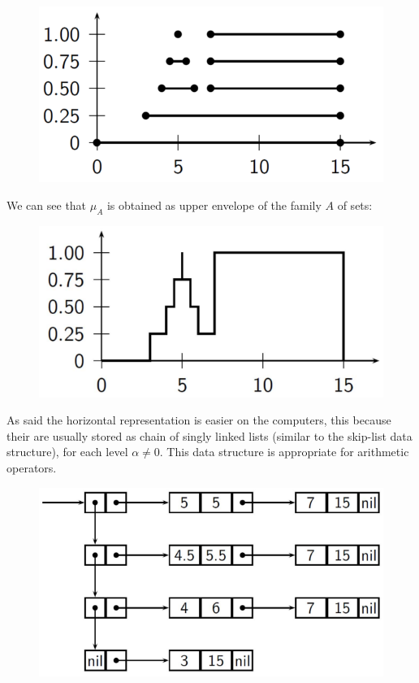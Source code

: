 \documentclass{article}
\begin{document}
\begin{figure}[H]
    \centering
    \includegraphics[scale=0.5]{images/alpha-cuts-repr0.png}
\end{figure}
We can see that $\mu_A$ is obtained as upper envelope of the family $A$ of sets:
\begin{figure}[H]
    \centering
    \includegraphics[scale=0.5]{images/alpha-cuts-repr1.png}
\end{figure}
As said the horizontal representation is easier on the computers, this
because their are usually stored as chain of singly linked lists (similar
to the skip-list data structure), for each level $\alpha\neq 0$. This data structure is appropriate
for arithmetic operators.
\begin{figure}[H]
    \centering
    \includegraphics[scale=0.5]{images/linked.png}
\end{figure}
\end{document}
